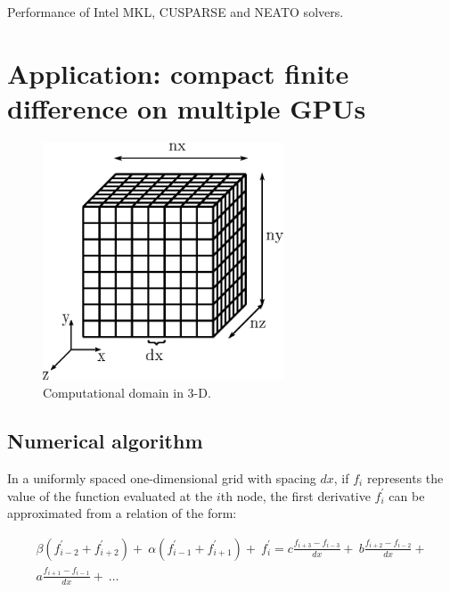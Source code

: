 \documentclass{elsarticle}
\begin{document}
\begin{table}
\scriptsize
\centering
\caption{Performance of Intel MKL, CUSPARSE and NEATO solvers.}
\label{table:bench}

\end{table}

\section{Application: compact finite difference on multiple GPUs}
\label{sec-compact-finite-differences}

\begin{figure}[h!]
\begin{center}
\includegraphics[height=200pt]{img/computational-domain.eps}
\caption{Computational domain in 3-D.}
\label{fig:computational-domain}
\end{center}
\end{figure}

\subsection{Numerical algorithm}

In a uniformly spaced one-dimensional grid with spacing $dx$,
if $f_i$ represents the value of
the function evaluated at the $i$th node,
the first derivative $f^{\prime}_i$ can be approximated from
a relation of the form:

\begin{equation}
\begin{split}
    \beta(f^{\prime}_{i-2} + f^{\prime}_{i+2}) + \
    \alpha(f^{\prime}_{i-1} + f^{\prime}_{i+1}) + \
        f^{\prime}_i
    = 
    c\frac{f_{i+3} - f_{i-3}}{dx} + \
    b\frac{f_{i+2} - f_{i-2}}{dx} + \\
    a\frac{f_{i+1} - f_{i-1}}{dx} + \
    \hdots
\end{split}
\label{eqn:general-compact}
\end{equation}
\end{document}

